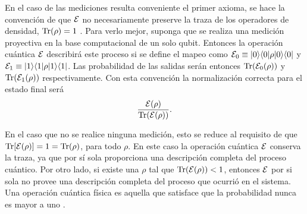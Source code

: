 En el caso de las mediciones resulta conveniente el primer axioma, se hace la
convención de que $\mathcal{E}$ no necesariamente preserve la traza de los operadores de
densidad, ${\rm Tr}(\rho)=1$ . Para verlo mejor, suponga que se realiza una medición
proyectiva en la base computacional de un solo qubit. Entonces la operación
cuántica $\mathcal{E}$ describirá este proceso si se define el mapeo como
$\mathcal{E}_0\equiv|0\rangle \langle0|\rho |0\rangle \langle 0|$ y $\mathcal{E}_1\equiv|1\rangle \langle1|\rho |1\rangle \langle 1|$.
Las probabilidad de las salidas serán entonces ${\rm Tr} (\mathcal{E}_0(\rho))$ y ${\rm Tr}
(\mathcal{E}_1(\rho))$ respectivamente.  Con esta convención la normalización correcta
para el estado final será \[\dfrac{\mathcal{E}(\rho)}{{\rm Tr} (\mathcal{E} (\rho))}.\]

En el caso que no se realice ninguna medición, esto se reduce al requisito de
que ${\rm Tr}[\mathcal{E}(\rho)] = 1 = {\rm Tr}(\rho)$, para todo $\rho$. En este caso la
operación cuántica $\mathcal{E}$ conserva la traza, ya que por sí sola proporciona una
descripción completa del proceso cuántico. Por otro lado, si existe una $\rho$
tal que ${\rm Tr}(\mathcal{E}(\rho)) < 1$, entonces $ \mathcal{E}$ por si sola no provee una
descripción completa del proceso que ocurrió en el sistema. Una operación
cuántica física es aquella que satisface que la probabilidad nunca es mayor a
uno {\cite{nielsen_chuang_2010}}.

\begin{comment}
Asimismo, una razón física para proponer el segundo axioma, es que se espera que la evolución de un estado cuántico sea lineal debido a que de esa forma es compatible con la interpretación del operador de densidad como un ensamble de posibles estados. Supóngase que $\E$ mapea al estado inicial $\rho$  en el tiempo $t=0$ al estado final al tiempo $t=T$, el estado $\rho_i$ es preparado con una probabilidad $p_i$. Luego el estado de evolución temporal en $t = T$ será $\E(\rho_i )$ con probabilidad $p_i$, por lo tanto el estado final $\rho'$ evoluciona como \begin{equation}
\rho'= \sum_i p_i \E (\rho_i).
\end{equation}

Por otro lado, el estado inicial es descrito por $\sum_i p_i \rho$, que evoluciona así 
\begin{equation}
    \rho'= \E\left(\sum_i p_i \rho_i\right).
\end{equation} Igualando las dos ecuaciones anteriores, se tiene  que $\E$ debe actuar linealmente, en combinaciones convexas de estados {\cite{preskill2020quantum}}.
\end{comment}

